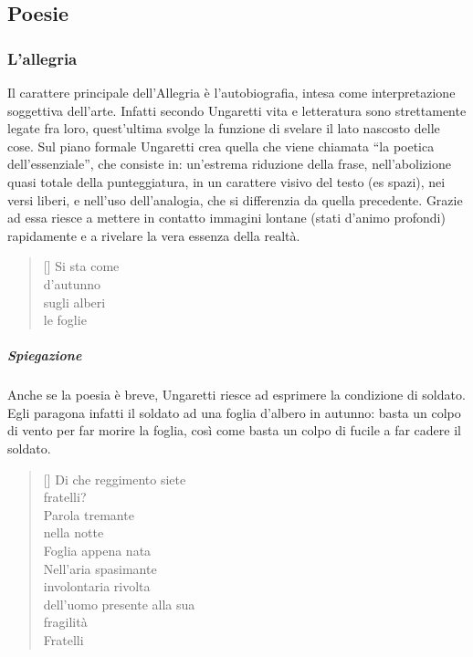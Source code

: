 \documentclass[10pt]{report}
\begin{document}
		
		\subsection{Poesie}
		
		\subsubsection{L'allegria}

		Il carattere principale dell’Allegria è l’autobiografia, intesa come interpretazione soggettiva dell’arte. 
		Infatti secondo Ungaretti vita e letteratura sono strettamente legate fra loro, quest’ultima svolge la funzione di svelare il lato nascosto delle cose. 
		Sul piano formale Ungaretti crea quella che viene chiamata “la poetica dell’essenziale”, che consiste in: un’estrema riduzione della frase, nell’abolizione quasi totale della punteggiatura, in un carattere visivo del testo (es spazi), nei versi liberi, e nell’uso dell’analogia, che si differenzia da quella precedente. 
		Grazie ad essa riesce a mettere in contatto immagini lontane (stati d’animo profondi) rapidamente e a rivelare la vera essenza della realtà.
		
		
		\renewcommand{\poemtoc}{subsection}
		\settowidth{\versewidth}{There was an old party of Lyme}
		
		\begin{verse}[\versewidth]
			Si sta come\\
			d'autunno\\
			sugli alberi\\
			le foglie\\
		\end{verse}
		
		\subparagraph[Soldati]{Spiegazione}Anche se la poesia è breve, Ungaretti riesce ad esprimere la condizione di soldato. Egli paragona infatti il soldato ad una foglia d'albero in autunno: basta un colpo di vento per far morire la foglia, così come basta un colpo di fucile a far cadere il soldato.
		

			\renewcommand{\poemtoc}{subsection}
		\settowidth{\versewidth}{There was an old party of Lyme}
		
		\begin{verse}[\versewidth]
			Di che reggimento siete\\
			fratelli?\\
			
			Parola tremante\\
			nella notte\\
			
			Foglia appena nata\\
			
			Nell'aria spasimante\\
			involontaria rivolta\\
			dell'uomo presente alla sua\\
			fragilità\\
			
			Fratelli\\
		\end{verse}
			
\end{document}
